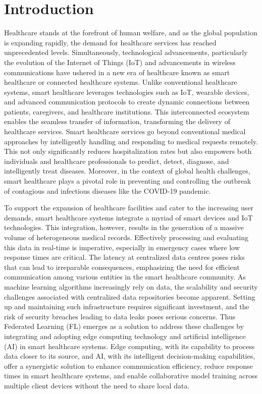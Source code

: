 \documentclass[conference]{IEEEtran}
\begin{document}
\section{Introduction}

Healthcare stands at the forefront of human welfare, and as the global population is expanding rapidly, the demand for healthcare services has reached unprecedented levels. Simultaneously, technological advancements, particularly the evolution of the Internet of Things (IoT) and advancements in wireless communications have ushered in a new era of healthcare known as smart healthcare\cite{1} or connected healthcare systems. Unlike conventional healthcare systems, smart healthcare leverages technologies such as IoT, wearable devices, and advanced communication protocols to create dynamic connections between patients, caregivers, and healthcare institutions. This interconnected ecosystem enables the seamless transfer of information, transforming the delivery of healthcare services. Smart healthcare services go beyond conventional medical approaches by intelligently handling and responding to medical requests remotely. This not only significantly reduces hospitalization rates but also empowers both individuals and healthcare professionals to predict, detect, diagnose, and intelligently treat diseases. Moreover, in the context of global health challenges, smart healthcare plays a pivotal role in preventing and controlling the outbreak of contagious and infectious diseases like the COVID-19 pandemic.

To support the expansion of healthcare facilities and cater to the increasing user demands, smart healthcare systems integrate a myriad of smart devices and IoT technologies. This integration, however, results in the generation of a massive volume of heterogeneous medical records. Effectively processing and evaluating this data in real-time is imperative, especially in emergency cases where low response times are critical. The latency at centralized data centres poses risks that can lead to irreparable consequences, emphasizing the need for efficient communication among various entities in the smart healthcare community. As machine learning algorithms increasingly rely on data, the scalability and security challenges associated with centralized data repositories become apparent. Setting up and maintaining such infrastructure requires significant investment, and the risk of security breaches leading to data leaks poses serious concerns. Thus Federated Learning (FL) emerges as a solution to address these challenges by integrating and adopting edge computing technology and artificial intelligence (AI)\cite{2} in smart healthcare systems. Edge computing, with its capability to process data closer to its source, and AI, with its intelligent decision-making capabilities, offer a synergistic solution to enhance communication efficiency, reduce response times in smart healthcare systems, and enable collaborative model training across multiple client devices without the need to share local data. 
\end{document}

